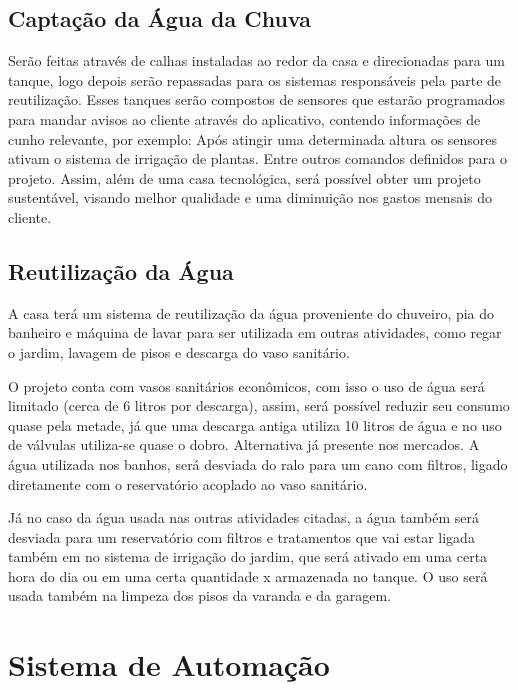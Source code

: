             \subsection{Captação da Água da Chuva}
                \par Serão feitas através  de calhas instaladas ao redor da casa e direcionadas para um tanque, logo depois serão repassadas para os sistemas responsáveis pela parte de reutilização. Esses tanques serão compostos de sensores que estarão programados para mandar avisos ao cliente através do aplicativo, contendo informações de cunho relevante, por exemplo: Após atingir uma determinada altura os sensores ativam o sistema de irrigação de plantas. Entre outros comandos definidos para o projeto. Assim, além de uma casa tecnológica, será possível obter um projeto sustentável, visando melhor qualidade e uma diminuição nos gastos mensais do cliente. \cite{ecycle}

            \subsection{Reutilização da Água}
                \par A casa terá um sistema de reutilização da água proveniente do chuveiro, pia do banheiro e máquina de lavar para ser utilizada em outras atividades, como regar o jardim, lavagem de pisos e descarga do vaso sanitário.
 	            \par O projeto conta com vasos sanitários econômicos, com isso o uso de água será limitado (cerca de 6 litros por descarga),  assim, será possível reduzir seu consumo quase pela metade, já que uma descarga antiga utiliza 10 litros de água e no uso de válvulas utiliza-se quase o dobro. Alternativa já presente nos mercados.  A água utilizada nos banhos, será desviada do ralo para um cano com filtros,  ligado diretamente com o reservatório acoplado ao vaso sanitário. \cite{sociedadedosol}
 	            \par Já no caso da água usada nas outras atividades citadas, a água também será desviada para um reservatório com filtros e tratamentos que vai estar ligada também em no sistema de irrigação do jardim, que será ativado em uma certa hora do dia ou em uma certa quantidade x armazenada no tanque. O uso será usada também na limpeza dos pisos da varanda e da garagem.

 	      \section{Sistema de Automação}
